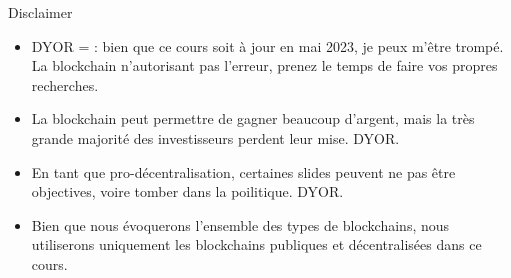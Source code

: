 \begin{frame}{Disclaimer}
  \begin{itemize}
    \item DYOR =  : bien que ce cours soit à jour en mai 2023, je peux m'être trompé. La blockchain n'autorisant pas l'erreur, prenez le temps de faire vos propres recherches.
    \item La blockchain peut permettre de gagner beaucoup d'argent, mais la très grande majorité des investisseurs perdent leur mise. DYOR.
    \item En tant que pro-décentralisation, certaines slides peuvent ne pas être objectives, voire tomber dans la poilitique. DYOR.
    \item Bien que nous évoquerons l'ensemble des types de blockchains, nous utiliserons uniquement les blockchains publiques et décentralisées dans ce cours.
  \end{itemize}
\end{frame}